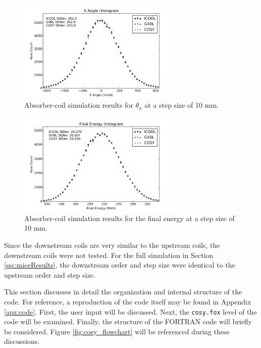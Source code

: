 \begin{figure}[H]
  \centering
    \includegraphics[width=0.7\textwidth]{MICE data/absorber coils/px} 
  \caption{Absorber-coil simulation results for $\theta_x$ at a step size of 10 mm.}
  \label{fig:acpx}
\end{figure}

\begin{figure}[H]
  \centering
    \includegraphics[width=0.7\textwidth]{MICE data/absorber coils/e} 
  \caption{Absorber-coil simulation results for the final energy at a step size of 10 mm.}
  \label{fig:ace}
\end{figure}

Since the downstream coils are very similar to the upstream coils, the downstream coils were not tested. For the full simulation in Section \ref{ssc:miceResults}, the downstream order and step size were identical to the upstream order and step size.

\label{sec:code_implementation}

This section discusses in detail the organization and internal structure of the code. For reference, a reproduction of the code itself may be found in Appendix \ref{apx:code}. First, the user input will be discussed. Next, the \texttt{cosy.fox} level of the code will be examined. Finally, the structure of the FORTRAN code will briefly be considered. Figure \ref{fig:cosy_flowchart} will be referenced during these discussions.

